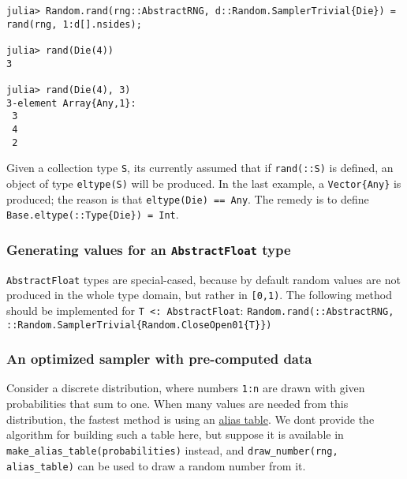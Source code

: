 \begin{verbatim}
julia> Random.rand(rng::AbstractRNG, d::Random.SamplerTrivial{Die}) = rand(rng, 1:d[].nsides);

julia> rand(Die(4))
3

julia> rand(Die(4), 3)
3-element Array{Any,1}:
 3
 4
 2
\end{verbatim}



Given a collection type \texttt{S}, it{\textquotesingle}s currently assumed that if \texttt{rand(::S)} is defined, an object of type \texttt{eltype(S)} will be produced. In the last example, a \texttt{Vector\{Any\}} is produced; the reason is that \texttt{eltype(Die) == Any}. The remedy is to define \texttt{Base.eltype(::Type\{Die\}) = Int}.



\hypertarget{1884287946239364410}{}


\subsubsection{Generating values for an \texttt{AbstractFloat} type}



\texttt{AbstractFloat} types are special-cased, because by default random values are not produced in the whole type domain, but rather in \texttt{[0,1)}. The following method should be implemented for \texttt{T <: AbstractFloat}: \texttt{Random.rand(::AbstractRNG, ::Random.SamplerTrivial\{Random.CloseOpen01\{T\}\})}



\hypertarget{11354689514356683227}{}


\subsubsection{An optimized sampler with pre-computed data}



Consider a discrete distribution, where numbers \texttt{1:n} are drawn with given probabilities that sum to one. When many values are needed from this distribution, the fastest method is using an \href{https://en.wikipedia.org/wiki/Alias\_method}{alias table}. We don{\textquotesingle}t provide the algorithm for building such a table here, but suppose it is available in \texttt{make\_alias\_table(probabilities)} instead, and \texttt{draw\_number(rng, alias\_table)} can be used to draw a random number from it.



